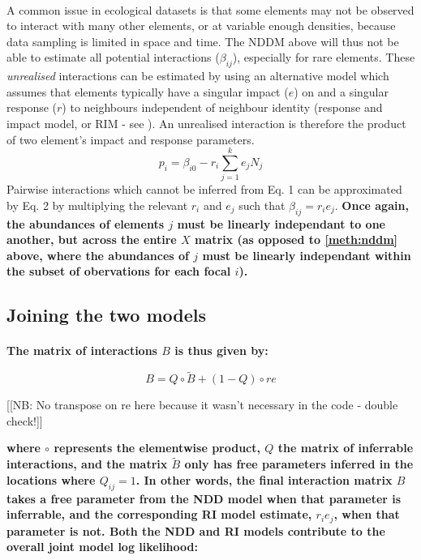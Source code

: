 \documentclass[a4,12pt]{article}
\begin{document}
    \paragraph{}
       A common issue in ecological datasets is that some elements may not be observed to interact with many other elements, or at variable enough densities, because data sampling is limited in space and time. The NDDM above will thus not be able to estimate all potential interactions ($\beta_{ij}$), especially for rare elements. These \textit{unrealised} interactions can be estimated by using an alternative model which assumes that elements typically have a singular impact ($e$) on and a singular response ($r$) to neighbours independent of neighbour identity (response and impact model, or RIM - see \cite{Godoy2014b}). An unrealised interaction is therefore the product of two element's impact and response parameters. 
        \begin{equation}
        p_{i} = \beta_{i0} - r_{i} \sum_{j=1}^{k} e_{j} N_{j}
        \label{rim}
        \end{equation}
        Pairwise interactions which cannot be inferred from Eq. 1 can be approximated by Eq. 2 by multiplying the relevant $r_{i}$ and $e_{j}$ such that $\beta_{ij} = r_{i} e_{j}$. \textbf{Once again, the abundances of elements $j$ must be linearly independant to one another, but across the entire $X$ matrix (as opposed to \ref{meth:nddm} above, where the abundances of $j$ must be linearly independant within the subset of obervations for each focal $i$).}


    \subsection{Joining the two models}
    \label{meth:addlog}

    \paragraph{}
    \textbf{
    The matrix of interactions $B$ is thus given by:}

        \begin{equation}
        B = Q \circ \tilde B + (1 - Q) \circ r e
        \label{matB}
        \end{equation}

    [[NB: No transpose on re here because it wasn't necessary in the code - double check!]]
    
    \textbf{where $\circ$ represents the elementwise product, $Q$ the matrix of inferrable interactions, and the matrix $\tilde B$ only has free parameters inferred in the locations where $Q_{ij} =1$. In other words, the final interaction matrix $B$ takes a free parameter from the NDD model when that parameter is inferrable, and the corresponding RI model estimate, $r_i e_j$, when that parameter is not. Both the NDD and RI models contribute to the overall joint model log likelihood:}
\end{document}
